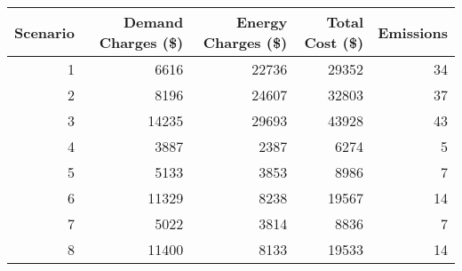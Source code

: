 \begin{tabular}{rrrrr}
\toprule
 Scenario &  Demand Charges (\$) &  Energy Charges (\$) &  Total Cost (\$) &  Emissions \\
\midrule
        1 &                6616 &               22736 &           29352 &         34 \\
        2 &                8196 &               24607 &           32803 &         37 \\
        3 &               14235 &               29693 &           43928 &         43 \\
        4 &                3887 &                2387 &            6274 &          5 \\
        5 &                5133 &                3853 &            8986 &          7 \\
        6 &               11329 &                8238 &           19567 &         14 \\
        7 &                5022 &                3814 &            8836 &          7 \\
        8 &               11400 &                8133 &           19533 &         14 \\
\bottomrule
\end{tabular}

